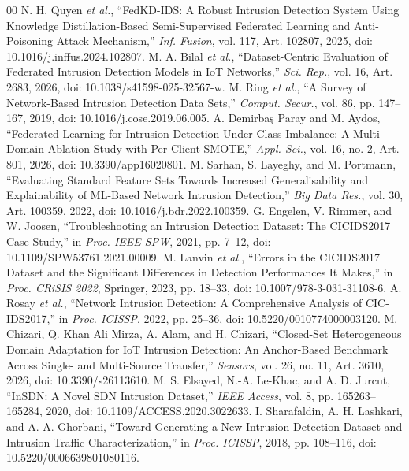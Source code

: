 \documentclass[conference,a4paper]{IEEEtran}
\begin{document}
\begin{thebibliography}{00}
 N. H. Quyen \textit{et al.}, ``FedKD-IDS: A Robust Intrusion Detection System Using Knowledge Distillation-Based Semi-Supervised Federated Learning and Anti-Poisoning Attack Mechanism,'' \textit{Inf. Fusion}, vol. 117, Art. 102807, 2025, doi: 10.1016/j.inffus.2024.102807.
 M. A. Bilal \textit{et al.}, ``Dataset-Centric Evaluation of Federated Intrusion Detection Models in IoT Networks,'' \textit{Sci. Rep.}, vol. 16, Art. 2683, 2026, doi: 10.1038/s41598-025-32567-w.
 M. Ring \textit{et al.}, ``A Survey of Network-Based Intrusion Detection Data Sets,'' \textit{Comput. Secur.}, vol. 86, pp. 147--167, 2019, doi: 10.1016/j.cose.2019.06.005.
 A. Demirba\c{s} Paray and M. Aydos, ``Federated Learning for Intrusion Detection Under Class Imbalance: A Multi-Domain Ablation Study with Per-Client SMOTE,'' \textit{Appl. Sci.}, vol. 16, no. 2, Art. 801, 2026, doi: 10.3390/app16020801.
 M. Sarhan, S. Layeghy, and M. Portmann, ``Evaluating Standard Feature Sets Towards Increased Generalisability and Explainability of ML-Based Network Intrusion Detection,'' \textit{Big Data Res.}, vol. 30, Art. 100359, 2022, doi: 10.1016/j.bdr.2022.100359.
 G. Engelen, V. Rimmer, and W. Joosen, ``Troubleshooting an Intrusion Detection Dataset: The CICIDS2017 Case Study,'' in \textit{Proc. IEEE SPW}, 2021, pp. 7--12, doi: 10.1109/SPW53761.2021.00009.
 M. Lanvin \textit{et al.}, ``Errors in the CICIDS2017 Dataset and the Significant Differences in Detection Performances It Makes,'' in \textit{Proc. CRiSIS 2022}, Springer, 2023, pp. 18--33, doi: 10.1007/978-3-031-31108-6.
 A. Rosay \textit{et al.}, ``Network Intrusion Detection: A Comprehensive Analysis of CIC-IDS2017,'' in \textit{Proc. ICISSP}, 2022, pp. 25--36, doi: 10.5220/0010774000003120.
 M. Chizari, Q. Khan Ali Mirza, A. Alam, and H. Chizari, ``Closed-Set Heterogeneous Domain Adaptation for IoT Intrusion Detection: An Anchor-Based Benchmark Across Single- and Multi-Source Transfer,'' \textit{Sensors}, vol. 26, no. 11, Art. 3610, 2026, doi: 10.3390/s26113610.
 M. S. Elsayed, N.-A. Le-Khac, and A. D. Jurcut, ``InSDN: A Novel SDN Intrusion Dataset,'' \textit{IEEE Access}, vol. 8, pp. 165263--165284, 2020, doi: 10.1109/ACCESS.2020.3022633.
 I. Sharafaldin, A. H. Lashkari, and A. A. Ghorbani, ``Toward Generating a New Intrusion Detection Dataset and Intrusion Traffic Characterization,'' in \textit{Proc. ICISSP}, 2018, pp. 108--116, doi: 10.5220/0006639801080116.
\end{thebibliography}
\end{document}
